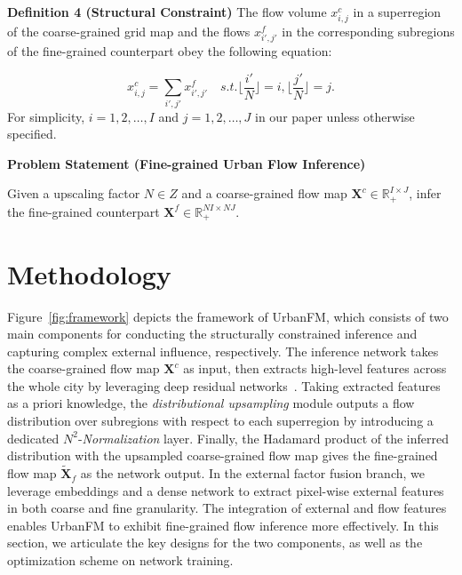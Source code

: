 \noindent\textbf{Definition 4 (Structural Constraint)} The flow volume $x^c_{i,j}$ in a superregion of the coarse-grained grid map and the flows $x^f_{i',j'}$ in the corresponding subregions of the fine-grained counterpart obey the following equation:
\iffalse
\begin{equation}
	\label{eqn:constrain}
	x^c_{i,j} = \sum_{\left\lfloor{\frac{i'}{N}}\right\rfloor=i,\left\lfloor{\frac{j'}{N}}\right\rfloor=j}{x^f_{i',j'}}.
\end{equation}
\begin{equation}
	\label{eqn:constrain}
	x^c_{i,j} = \sum_{i'=(i-1)*N+1,j'=(j-1)*N+1}^{i'=i*N,j'=j*N}{x^f_{i',j'}}
\end{equation}
\fi
\begin{equation}
	\label{eqn:constrain}
	x^c_{i,j} = \sum_{i',j'}{x^f_{i',j'}} \quad s.t. \lfloor{\frac{i'}{N}}\rfloor=i,\lfloor{\frac{j'}{N}}\rfloor=j.
\end{equation}
For simplicity, $i=1,2,\dots,I$ and $j=1,2,\dots,J$ in our paper unless otherwise specified.

\noindent\textbf{Problem Statement (Fine-grained Urban Flow Inference)}

\noindent Given a upscaling factor $N\in Z$ and a coarse-grained flow map $\mathbf{X}^c\in\mathbb{R}^{I\times J}_{+}$, infer the fine-grained counterpart $\mathbf{X}^f\in\mathbb{R}^{NI\times NJ}_{+}$.



\section{Methodology}

Figure~\ref{fig:framework} depicts the framework of UrbanFM, which consists of two main components for conducting the structurally constrained inference and capturing complex external influence, respectively. The inference network takes the coarse-grained flow map $\mathbf{X}^c$ as input, then extracts high-level features across the whole city by leveraging deep residual networks~\cite{he2016deep}. Taking extracted features as a priori knowledge, the \textit{distributional upsampling} module outputs a flow distribution over subregions with respect to each superregion by introducing a dedicated $N^2$-\textit{Normalization} layer. Finally, the Hadamard product of the inferred distribution with the upsampled coarse-grained flow map gives the fine-grained flow map $\tilde{\mathbf{X}}_f$ as the network output. In the external factor fusion branch, we leverage embeddings and a dense network to extract pixel-wise external features in both coarse and fine granularity. The integration of external and flow features enables UrbanFM to exhibit fine-grained flow inference more effectively. In this section, we articulate the key designs for the two components, as well as the optimization scheme on network training.

